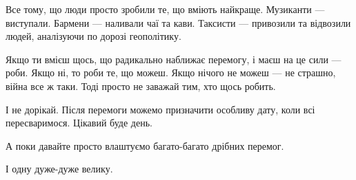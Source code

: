 Все тому, що люди просто зробили те, що вміють найкраще. Музиканти — виступали.
Бармени — наливали чаї та кави. Таксисти — привозили та відвозили людей,
аналізуючи по дорозі геополітику.

Якщо ти вмієш щось, що радикально наближає перемогу, і маєш на це сили — роби.
Якщо ні, то роби те, що можеш. Якщо нічого не можеш — не страшно, війна все ж
таки. Тоді просто не заважай тим, хто щось робить.

І не дорікай. Після перемоги можемо призначити особливу дату, коли всі
пересваримося. Цікавий буде день.

А поки давайте просто влаштуємо багато-багато дрібних перемог.

І одну дуже-дуже велику.

